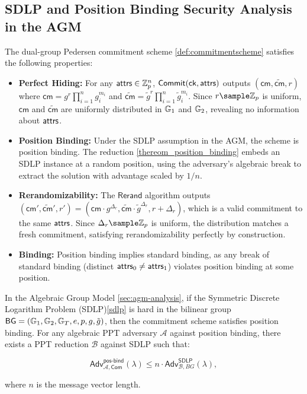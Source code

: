 \subsection{SDLP and Position Binding Security Analysis in the AGM}

The dual-group Pedersen commitment scheme \ref{def:commitmentscheme} satisfies the following properties:

\begin{itemize}
    \item \textbf{Perfect Hiding:} For any $\mathsf{attrs} \in \mathbb{Z}_p^n$, $\mathsf{Commit}(\mathsf{ck}, \mathsf{attrs})$ outputs $(\mathsf{cm}, \widetilde{\mathsf{cm}}, r)$ where $\mathsf{cm} = g^r \prod_{i=1}^n g_i^{m_i}$ and $\widetilde{\mathsf{cm}} = \tilde{g}^r \prod_{i=1}^n \tilde{g}_i^{m_i}$. Since $r \sample \Z_p$ is uniform, $\mathsf{cm}$ and $\widetilde{\mathsf{cm}}$ are uniformly distributed in $\mathbb{G}_1$ and $\mathbb{G}_2$, revealing no information about $\mathsf{attrs}$.

    \item \textbf{Position Binding:} Under the SDLP assumption in the AGM, the scheme is position binding. The reduction \ref{thereom_position_binding} embeds an SDLP instance at a random position, using the adversary’s algebraic break to extract the solution with advantage scaled by $1/n$.

    \item \textbf{Rerandomizability:} The $\mathsf{Rerand}$ algorithm outputs $(\mathsf{cm}', \widetilde{\mathsf{cm}}', r') = (\mathsf{cm} \cdot g^{\Delta_r}, \widetilde{\mathsf{cm}} \cdot \tilde{g}^{\Delta_r}, r + \Delta_r)$, which is a valid commitment to the same $\mathsf{attrs}$. Since $\Delta_r \sample \Z_p$ is uniform, the distribution matches a fresh commitment, satisfying rerandomizability perfectly by construction.

    \item \textbf{Binding:} Position binding implies standard binding, as any break of standard binding (distinct $\mathsf{attrs}_0 \neq \mathsf{attrs}_1$) violates position binding at some position.
\end{itemize}

\begin{theorem}\label{thereom_position_binding}
In the Algebraic Group Model \ref{sec:agm-analysis}, if the Symmetric Discrete Logarithm Problem (SDLP)\ref{sdlp} is hard in the bilinear group $\mathsf{BG} = (\mathbb{G}_1, \mathbb{G}_2, \mathbb{G}_T, e, p, g, \tilde{g})$, then the commitment scheme satisfies position binding. For any algebraic PPT adversary $\mathcal{A}$ against position binding, there exists a PPT reduction $\mathcal{B}$ against SDLP such that:

$$\mathsf{Adv}^{\mathsf{pos\text{-}bind}}_{\mathcal{A}, \mathsf{Com}}(\lambda) \leq n \cdot \mathsf{Adv}^{\mathsf{SDLP}}_{\mathcal{B}, BG}(\lambda),$$

where $n$ is the message vector length.
\end{theorem}

